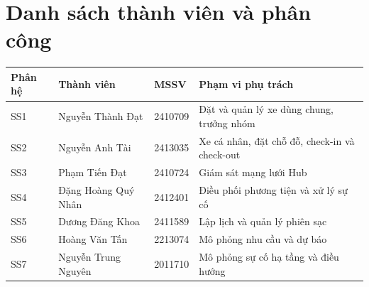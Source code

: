 \chapter*{Danh sách thành viên và phân công}
\noindent\begin{tabularx}{\linewidth}{@{}ll l X@{}}
\toprule
\textbf{Phân hệ} & \textbf{Thành viên} & \textbf{MSSV} & \textbf{Phạm vi phụ trách} \\
\midrule
SS1 & Nguyễn Thành Đạt & 2410709 & Đặt và quản lý xe dùng chung, trưởng nhóm \\
SS2 & Nguyễn Anh Tài & 2413035 & Xe cá nhân, đặt chỗ đỗ, check-in và check-out \\
SS3 & Phạm Tiến Đạt & 2410724 & Giám sát mạng lưới Hub \\
SS4 & Đặng Hoàng Quý Nhân & 2412401 & Điều phối phương tiện và xử lý sự cố \\
SS5 & Dương Đăng Khoa & 2411589 & Lập lịch và quản lý phiên sạc \\
SS6 & Hoàng Văn Tấn & 2213074 & Mô phỏng nhu cầu và dự báo \\
SS7 & Nguyễn Trung Nguyên & 2011710 & Mô phỏng sự cố hạ tầng và điều hướng \\
\bottomrule
\end{tabularx}
